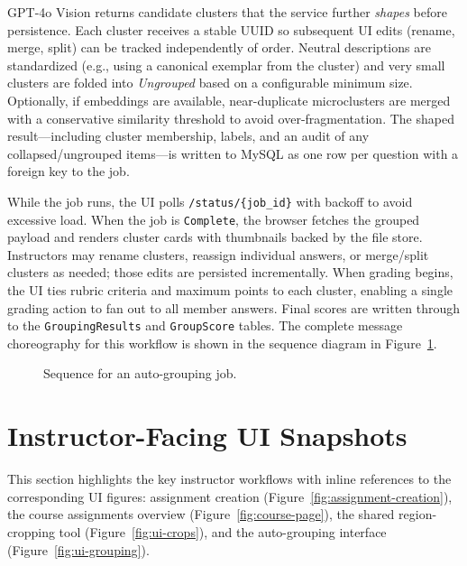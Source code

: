 \documentclass[ms,twoside,print]{nuthesis}
\begin{document}
GPT-4o Vision returns candidate clusters that the service further \emph{shapes} before persistence. Each cluster receives a stable UUID so subsequent UI edits (rename, merge, split) can be tracked independently of order. Neutral descriptions are standardized (e.g., using a canonical exemplar from the cluster) and very small clusters are folded into \emph{Ungrouped} based on a configurable minimum size. Optionally, if embeddings are available, near-duplicate microclusters are merged with a conservative similarity threshold to avoid over-fragmentation. The shaped result---including cluster membership, labels, and an audit of any collapsed/ungrouped items---is written to MySQL as one row per question with a foreign key to the job.

While the job runs, the UI polls \texttt{/status/\{job\_id\}} with backoff to avoid excessive load. When the job is \texttt{Complete}, the browser fetches the grouped payload and renders cluster cards with thumbnails backed by the file store. Instructors may rename clusters, reassign individual answers, or merge/split clusters as needed; those edits are persisted incrementally. When grading begins, the UI ties rubric criteria and maximum points to each cluster, enabling a single grading action to fan out to all member answers. Final scores are written through to the \texttt{GroupingResults} and \texttt{GroupScore} tables. The complete message choreography for this workflow is shown in the sequence diagram in Figure~\ref{fig:sequence}.

\begin{figure}[htb]
  \centering
  
  \caption{Sequence for an auto-grouping job.}
  \label{fig:sequence}
\end{figure}

\section{Instructor-Facing UI Snapshots}
This section highlights the key instructor workflows with inline references to the corresponding UI figures: assignment creation (Figure~\ref{fig:assignment-creation}), the course assignments overview (Figure~\ref{fig:course-page}), the shared region-cropping tool (Figure~\ref{fig:ui-crops}), and the auto-grouping interface (Figure~\ref{fig:ui-grouping}).
\end{document}
